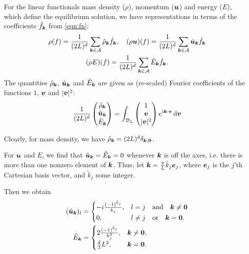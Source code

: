 For the linear functionals mass density ($\rho$), momentum (${\bm u}$) and energy ($E$), which define the
equilibrium solution, we have representations in terms of the coefficients $\hat{f}_{\bm k}$ from \eqref{eqn:fn}:
\begin{gather*}
    \rho(f) = \frac{1}{(2L)^d}\sum_{{\bm k}\in\mathcal{A}} \hat{\rho}_{\bm k}\hat{f}_{\bm k}, \quad
    (\rho{\bm u})(f) = \frac{1}{(2L)^d}\sum_{{\bm k}\in\mathcal{A}} \hat{{\bm u}}_{\bm k}\hat{f}_{\bm k}\\
    (\rho E)(f) = \frac{1}{(2L)^d}\sum_{{\bm k}\in\mathcal{A}} \hat{E}_{\bm k}\hat{f}_{\bm k}.
\end{gather*}
The quantities $\hat{\rho}_{\bm k}$, $\hat{{\bm u}}_{\bm k}$ and $\hat{E}_{\bm k}$ are given as
(re-scaled) Fourier coefficients of the functions $1$, ${\bm v}$ and $|{\bm v}|^2$:
\[
    \frac{1}{(2L)^d}
    \begin{pmatrix} 
        \hat{\rho}_{\bm k} \\ \hat{{\bm u}}_{\bm k} \\ \hat{E}_{\bm k} 
    \end{pmatrix} 
    = \int_{\mathcal{D}_L} 
    \begin{pmatrix} 
        1 \\ {\bm v} \\ |{\bm v}|^2 
    \end{pmatrix} 
    e^{i{\bm k}\cdot {\bm v}} \,\mathrm{d} {\bm v}
\]

Clearly, for mass density, we have $\hat{\rho}_{\bm k} = (2L)^d\delta_{{\bm k},{\bm0}}$.

For ${\bm u}$ and $E$, we find that $\hat{{\bm u}}_{\bm k} = \hat{E}_{\bm k} = 0$ whenever
${\bm k}$ is off the axes, i.e. there is more than one nonzero element of ${\bm k}$.
Thus, let ${\bm k} = \frac{\pi}{L}\tilde{k}_j{\bm e}_j$, where ${\bm e}_j$ is the $j$'th
Cartesian basis vector, and $\tilde{k}_j$ some integer. 

Then we obtain
\begin{align*}
    (\hat{{\bm u}}_{\bm k})_l &= 
    \begin{cases} 
        -i\frac{(-1)^{\tilde{k}_j}}{k_j}, & l=j \quad\text{and}\quad 
                {\bm k}\neq{\bm0} \\ 
        0, & l\neq j \quad\text{or}\quad {\bm k} = {\bm0}. 
    \end{cases} \\
    \hat{E}_{\bm k} &= 
    \begin{cases} 
        2\frac{(-1)^{\tilde{k}_j}}{k_j^2}, & {\bm k}\neq{\bm0}, \\
        \frac{d}{3}L^2, & {\bm k} = {\bm0}.
    \end{cases}
\end{align*}


